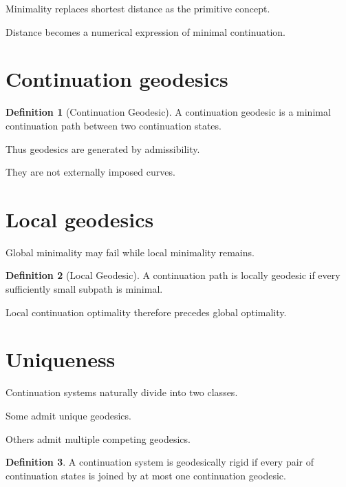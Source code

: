 \documentclass[13pt,openany]{book}
\theoremstyle{plain}
\theoremstyle{definition}
\newtheorem{definition}{Definition}[chapter]
\begin{document}
Minimality replaces shortest distance as the primitive concept.

Distance becomes a numerical expression of minimal continuation.


\section{Continuation geodesics}

\begin{definition}[Continuation Geodesic]

A continuation geodesic is a minimal continuation path between two continuation states.

\end{definition}

Thus geodesics are generated by admissibility.

They are not externally imposed curves.


\section{Local geodesics}

Global minimality may fail while local minimality remains.

\begin{definition}[Local Geodesic]

A continuation path is locally geodesic if every sufficiently small subpath is minimal.

\end{definition}

Local continuation optimality therefore precedes global optimality.


\section{Uniqueness}

Continuation systems naturally divide into two classes.

Some admit unique geodesics.

Others admit multiple competing geodesics.

\begin{definition}

A continuation system is geodesically rigid if every pair of continuation states is joined by at most one continuation geodesic.

\end{definition}
\end{document}

